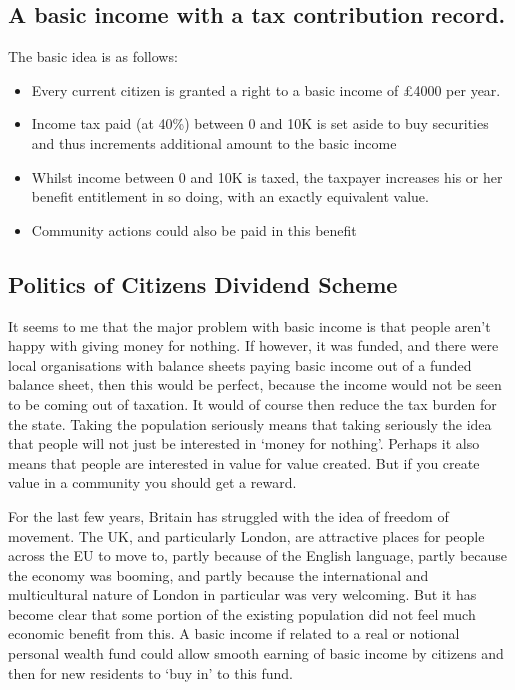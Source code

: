 \documentclass[]{tufte-handout}
\providecommand{\tightlist}{%
  \setlength{\itemsep}{0pt}\setlength{\parskip}{0pt}}
\begin{document}
\hypertarget{a-basic-income-with-a-tax-contribution-record.}{%
\subsection{A basic income with a tax contribution
record.}\label{a-basic-income-with-a-tax-contribution-record.}}

The basic idea is as follows:

\begin{itemize}
\tightlist
\item
  Every current citizen is granted a right to a basic income of £4000
  per year.
\item
  Income tax paid (at 40\%) between 0 and 10K is set aside to buy
  securities and thus increments additional amount to the basic income
\item
  Whilst income between 0 and 10K is taxed, the taxpayer increases his
  or her benefit entitlement in so doing, with an exactly equivalent
  value.
\item
  Community actions could also be paid in this benefit
\end{itemize}

\hypertarget{politics-of-citizens-dividend-scheme}{%
\subsection{Politics of Citizens Dividend
Scheme}\label{politics-of-citizens-dividend-scheme}}

It seems to me that the major problem with basic income is that people
aren't happy with giving money for nothing. If however, it was funded,
and there were local organisations with balance sheets paying basic
income out of a funded balance sheet, then this would be perfect,
because the income would not be seen to be coming out of taxation. It
would of course then reduce the tax burden for the state. Taking the
population seriously means that taking seriously the idea that people
will not just be interested in `money for nothing'. Perhaps it also
means that people are interested in value for value created. But if you
create value in a community you should get a reward.

For the last few years, Britain has struggled with the idea of freedom
of movement. The UK, and particularly London, are attractive places for
people across the EU to move to, partly because of the English language,
partly because the economy was booming, and partly because the
international and multicultural nature of London in particular was very
welcoming. But it has become clear that some portion of the existing
population did not feel much economic benefit from this. A basic income
if related to a real or notional personal wealth fund could allow smooth
earning of basic income by citizens and then for new residents to `buy
in' to this fund.
\end{document}
